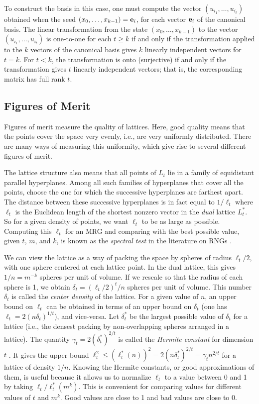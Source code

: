 To construct the basis in this case, one must compute the vector
$(u_{i_1},\dots,u_{i_t})$ obtained when the seed $(x_0,\dots,x_{k-1})={\bf e}_i$,
for each vector ${\bf e}_i$ of the canonical basis.
The linear transformation from the state $(x_0,\dots,x_{k-1})$ to the 
vector $(u_{i_1},\dots,u_{i_t})$ is one-to-one for each $t\ge k$ if and only if
the transformation applied to the $k$ vectors of the canonical basis gives
$k$ linearly independent vectors for $t=k$.
For $t < k$, the transformation is onto (surjective) if and only if the 
transformation gives $t$ linearly independent vectors; that is, the corresponding
matrix has full rank $t$.

\subsection {Figures of Merit}

Figures of merit measure the quality of lattices.
Here, good quality means that the points cover the space very evenly,
i.e., are very uniformly distributed.
There are many ways of measuring this uniformity, which give rise
to several different figures of merit.

The lattice structure also means that all points of $L_t$ lie in a family
of equidistant parallel hyperplanes.  Among all such families of
hyperplanes that cover all the points, choose the one for which the successive
hyperplanes are farthest apart.
The distance between these successive hyperplanes is in fact equal to 
$1/\ell_t$ where $\ell_t$ is the Euclidean 
length of the shortest nonzero vector in the {\em dual} lattice $L_t^*$.
So for a given density of points, we want $\ell_t$ to be as 
large as possible.  Computing this $\ell_t$ for an MRG and comparing
with the best possible value, given $t$, $m$, and $k$, is known
as the {\em spectral test\/} in the literature on RNGs 
\cite{rKNU97a,sFIS96a}.

We can view the lattice as a way of packing the space by spheres of
radius $\ell_t/2$, with one sphere centered at each lattice point.
In the dual lattice, this gives $1/n = m^{-k}$ spheres per unit of volume.
If we rescale so that the radius of each sphere is 1,
we obtain $\delta_t = (\ell_t/2)^t/n$ spheres per unit of volume.
This number $\delta_t$ is called the {\em center density\/} of the lattice.
For a given value of $n$, an upper bound on $\ell_t$ can be obtained 
in terms of an upper bound on $\delta_t$ (one has 
$\ell_t = 2 (n\delta_t)^{1/t}$), and vice-versa.
Let $\delta_t^*$ be the largest possible value of $\delta_t$ for a
lattice (i.e., the densest packing by non-overlapping spheres arranged
in a lattice).  The quantity $\gamma_t = 2(\delta_t^*)^{2/t}$
is called the {\em Hermite constant\/} for dimension $t$
\cite{mCON99a,mGRU87a}.  It gives the upper bound 
$\ell_t^2\le (\ell_t^*(n))^2 = 2(n\delta_t^*)^{2/t} = \gamma_t n^{2/t}$
for a lattice of density $1/n$.
Knowing the Hermite constants, or good approximations of them, is useful
because it allows us to normalize $\ell_t$ to a value between 0 and 1 by
taking $\ell_t/\ell_t^*(m^k)$.  This is convenient for comparing values for
different values of $t$ and $m^k$.
Good values are close to 1 and bad values are close to 0.

